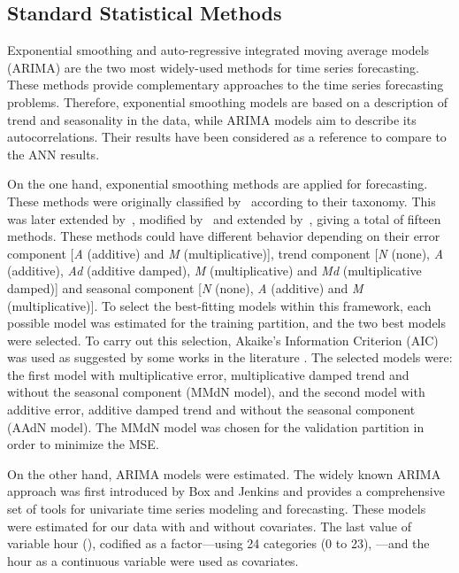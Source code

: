 \documentclass[energies,article,accept,moreauthors,pdftex,12pt,a4paper]{mdpi}
\newcommand{\ann}{ANN\xspace}
\begin{document}
\subsection{Standard Statistical Methods}

Exponential smoothing and auto-regressive integrated moving average models
(ARIMA) are the two most widely-used methods for time series forecasting. These
methods provide complementary approaches to the time series forecasting
problems. Therefore, exponential smoothing models are based on a description of trend
and seasonality in the data, while ARIMA models aim to describe its
autocorrelations. Their results have been considered as a reference to compare to the
\ann results.

On the one hand, exponential smoothing methods are applied for forecasting. These
methods were originally classified by~\cite{1969:journal:pegels} according to
their taxonomy. This was later extended by~\cite{1985:journal:gardner}, \linebreak modified
by~\cite{2002:journal:hyndman} and extended by~\cite{2003:journal:taylor},
giving a total of fifteen methods. These methods could have different behavior
depending on their error component [\emph{A} (additive) and \textit{M} (multiplicative)],
trend component [\emph{N} (none), \textit{A} (additive), \textit{Ad} (additive damped),
 \textit{M} (multiplicative) and \textit{Md} (multiplicative damped)] and seasonal component
[\emph{N} (none), \textit{A} (additive) and \textit{M} (multiplicative)]. To select the best-fitting
models within this framework, each possible model was estimated for the training
partition, and the two best models were selected. To carry out this selection,
Akaike's Information Criterion (AIC) was used as suggested by some works in the
literature \cite{Billah2006239,snyder2009exponential}. The selected models were:
\linebreak the first model with multiplicative error, multiplicative damped trend and without
the seasonal component (MMdN model), and the second model with additive error, additive
damped trend and without the seasonal component (AAdN model). The MMdN model was
chosen for the validation partition in order to minimize the MSE.

On the other hand, ARIMA models were estimated. The widely known ARIMA approach was first introduced by Box and Jenkins \cite{Box.Jenkins1976} and provides
a comprehensive set of tools for univariate time series modeling and forecasting.
These models were estimated for our data with and without covariates.
\linebreak The last value of variable hour (), codified as a factor---using 24 categories (0 to 23), ---and the hour as a continuous variable were used as covariates.
\end{document}
